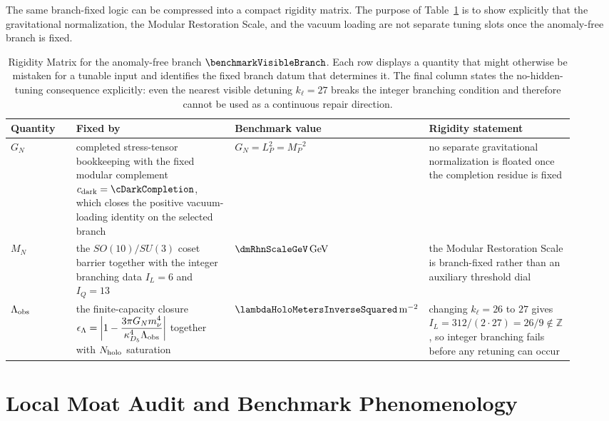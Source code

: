 \documentclass[11pt]{article}
\begin{document}
The same branch-fixed logic can be compressed into a compact rigidity matrix.
The purpose of Table~\ref{tab:s2-rigidity-matrix} is to show explicitly that
the gravitational normalization, the Modular Restoration Scale, and the vacuum
loading are not separate tuning slots once the anomaly-free branch is fixed.

\begin{table}[t]
\centering
\small
\setlength{\tabcolsep}{4pt}
\renewcommand{\arraystretch}{1.15}
\begin{tabular}{>{\raggedright\arraybackslash}p{0.15\linewidth}>{\raggedright\arraybackslash}p{0.31\linewidth}>{\centering\arraybackslash}p{0.17\linewidth}>{\raggedright\arraybackslash}p{0.29\linewidth}}
\hline
Quantity & Fixed by & Benchmark value & Rigidity statement \\
\hline
$G_N$ & completed stress-tensor bookkeeping with the fixed modular complement $c_{\rm dark}=\cDarkCompletion$, which closes the positive vacuum-loading identity on the selected branch & $G_N=L_P^2=M_P^{-2}$ & no separate gravitational normalization is floated once the completion residue is fixed \\

$M_N$ & the $SO(10)/SU(3)$ coset barrier together with the integer branching data $I_L=6$ and $I_Q=13$ & $\dmRhnScaleGeV\,\mathrm{GeV}$ & the Modular Restoration Scale is branch-fixed rather than an auxiliary threshold dial \\

$\Lambda_{\rm obs}$ & the finite-capacity closure
$\epsilon_{\Lambda}=\left|1-\dfrac{3\pi G_N m_{\nu}^4}{\kappa_{D_5}^4\Lambda_{\rm obs}}\right|$
together with $N_{\rm holo}$ saturation & $\lambdaHoloMetersInverseSquared\,\mathrm{m}^{-2}$ & changing $k_{\ell}=26$ to $27$ gives $I_L=312/(2\cdot27)=26/9\notin\mathbb Z$, so integer branching fails before any retuning can occur \\
\hline
\end{tabular}
\caption{Rigidity Matrix for the anomaly-free branch $\benchmarkVisibleBranch$. Each row displays a quantity that might otherwise be mistaken for a tunable input and identifies the fixed branch datum that determines it. The final column states the no-hidden-tuning consequence explicitly: even the nearest visible detuning $k_{\ell}=27$ breaks the integer branching condition and therefore cannot be used as a continuous repair direction.}
\label{tab:s2-rigidity-matrix}
\end{table}

\section{Local Moat Audit and Benchmark Phenomenology}
\end{document}

